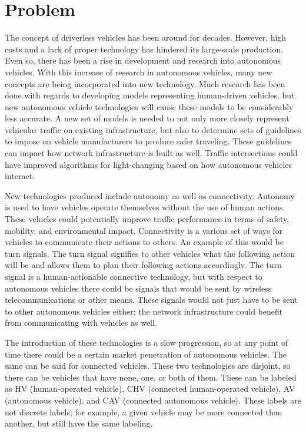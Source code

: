 \documentclass[onecolumn, draftclsnofoot,10pt, compsoc]{IEEEtran}
\begin{document}
\newpage
{}
\tableofcontents
\clearpage

\section{Problem}
The concept of driverless vehicles has been around for decades.
However, high costs and a lack of proper technology has hindered its large-scale production.
Even so, there has been a rise in development and research into autonomous vehicles.
With this increase of research in autonomous vehicles, many new concepts are being incorporated into new technology.
Much research has been done with regards to developing models representing human-driven vehicles, but new autonomous vehicle technologies will cause these models to be considerably less accurate.
A new set of models is needed to not only more closely represent vehicular traffic on existing infrastructure, but also to determine sets of guidelines to impose on vehicle manufacturers to produce safer traveling.
These guidelines can impact how network infrastructure is built as well.
Traffic intersections could have improved algorithms for light-changing based on how autonomous vehicles interact.

New technologies produced include autonomy as well as connectivity.
Autonomy is used to have vehicles operate themselves without the use of human actions.
These vehicles could potentially improve traffic performance in terms of safety, mobility, and environmental impact.
Connectivity is a various set of ways for vehicles to communicate their actions to others.
An example of this would be turn signals.
The turn signal signifies to other vehicles what the following action will be and allows them to plan their following actions accordingly.
The turn signal is a human-actionable connective technology, but with respect to autonomous vehicles there could be signals that would be sent by wireless telecommunications or other means.
These signals would not just have to be sent to other autonomous vehicles either; the network infrastructure could benefit from communicating with vehicles as well.

The introduction of these technologies is a slow progression, so at any point of time there could be a certain market penetration of autonomous vehicles.
The same can be said for connected vehicles.
These two technologies are disjoint, so there can be vehicles that have none, one, or both of them.
These can be labeled as HV (human-operated vehicle), CHV (connected human-operated vehicle), AV (autonomous vehicle), and CAV (connected autonomous vehicle).
These labels are not discrete labels; for example, a given vehicle may be more connected than another, but still have the same labeling.
\end{document}
